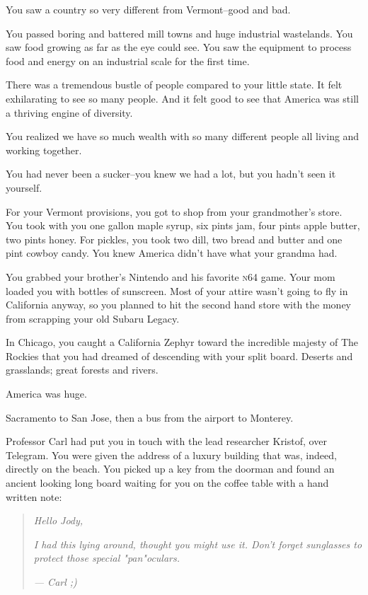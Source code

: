 \documentclass[a5paper, symmetric]{tufte-book}
\begin{document}
You saw a country so very different from Vermont--good and bad. 

You passed boring and battered mill towns and huge industrial wastelands. You saw food growing as far as the eye could see. You saw the equipment to process food and energy on an industrial scale for the first time. 

There was a tremendous bustle of people compared to your little state. It felt exhilarating to see so many people. And it felt good to see that America was still a thriving engine of diversity. 

You realized we have so much wealth with so many different people all living and working together. 

You had never been a sucker--you knew we had a lot, but you hadn't seen it yourself. 

For your Vermont provisions, you got to shop from your grandmother's store. You took with you one gallon maple syrup, six pints jam, four pints apple butter, two pints honey. For pickles, you took two dill, two bread and butter and one pint cowboy candy. You knew America didn't have what your grandma had.

You grabbed your brother's Nintendo and his favorite \textsc{n}64 game. Your mom loaded you with bottles of sunscreen. Most of your attire wasn't going to fly in California anyway, so you planned to hit the second hand store with the money from scrapping your old Subaru Legacy.

In Chicago, you caught a California Zephyr toward the incredible majesty of The Rockies that you had dreamed of descending with your split board. Deserts and grasslands; great forests and rivers. 

America was huge.

Sacramento to San Jose, then a bus from the airport to Monterey. 

Professor Carl had put you in touch with the lead researcher Kristof, over Telegram. You were given the address of a luxury building that was, indeed, directly on the beach. You picked up a key from the doorman and found an ancient looking long board waiting for you on the coffee table with a hand written note:

\begin{quote}
  \small\textit{Hello Jody,}
  
  \textit{I had this lying around, thought you might use it. Don't forget sunglasses to protect those special "pan"oculars.}
  
  \hfill \textit{— Carl ;)}
\end{quote}
\end{document}
